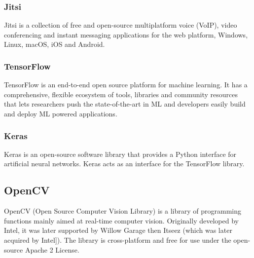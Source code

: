     \subsubsection{Jitsi}
    Jitsi is a collection of free and open-source multiplatform voice (VoIP), video conferencing and instant messaging applications for the web platform, 
    Windows, Linux, macOS, iOS and Android.

    \subsubsection{TensorFlow}
    TensorFlow is an end-to-end open source platform for machine learning. It has a comprehensive, flexible ecosystem of tools, 
    libraries and community resources that lets researchers push the state-of-the-art in ML and developers easily build and deploy ML powered applications.

    \subsubsection{Keras}
    Keras is an open-source software library that provides a Python interface for artificial neural networks. Keras acts as an interface for the TensorFlow library.
    
    \subsection{OpenCV}
    OpenCV (Open Source Computer Vision Library) is a library of programming functions mainly aimed at real-time computer vision. Originally developed by Intel, 
    it was later supported by Willow Garage then Itseez (which was later acquired by Intel]). The library is cross-platform and free for use under the open-source Apache 2 License. 